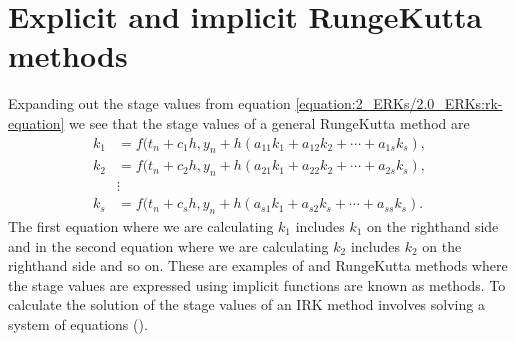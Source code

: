 \documentclass[letterpaper,10pt,english]{jupyterBook}
\begin{document}
\section{Explicit and implicit Runge\sphinxhyphen{}Kutta methods}
\label{\detokenize{2_ERKs/2.0_ERKs:explicit-and-implicit-runge-kutta-methods}}\label{\detokenize{2_ERKs/2.0_ERKs:explicit-and-implicit-rk-methods-section}}
\sphinxAtStartPar
Expanding out the stage values from equation \eqref{equation:2_ERKs/2.0_ERKs:rk-equation} we see that the stage values of a general Runge\sphinxhyphen{}Kutta method are
\begin{align*}
    k_1 &=f(t_n +c_1 h,y_n +h(a_{11} k_1 +a_{12} k_2 +\cdots +a_{1s} k_s ),\\
    k_2 &=f(t_n +c_2 h,y_n +h(a_{21} k_1 +a_{22} k_2 +\cdots +a_{2s} k_s ),\\
    &\vdots \\
    k_s &=f(t_n +c_s h,y_n +h(a_{s1} k_1 +a_{s2} k_s +\cdots +a_{ss} k_s ).
\end{align*}
\sphinxAtStartPar
The first equation where we are calculating \(k_1\) includes \(k_1\) on the right\sphinxhyphen{}hand side and in the second equation where we are calculating \(k_2\) includes \(k_2\) on the right\sphinxhyphen{}hand side and so on. These are examples of  and Runge\sphinxhyphen{}Kutta methods where the stage values are expressed using implicit functions are known as  methods. To calculate the solution of the stage values of an IRK method involves solving a system of equations ({\hyperref[\detokenize{3_IRKs/3.0_IRKs:irk-chapter}]{}}).
\end{document}
